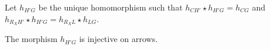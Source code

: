\begin{lemma}
    \label{lem:inj_graph_homo}
    Let $h_{H'G}$ be the unique homomorphism such that $h_{CH'} \mathop{\star} h_{H'G} \mathop{=} h_{CG}$ and $h_{R_XH'} \mathop{\star} h_{H'G} \mathop{=} h_{R_XL} \mathop{\star} h_{LG}$.
            

   The morphism $h_{H'G}$ is injective on arrows.

\end{lemma}
